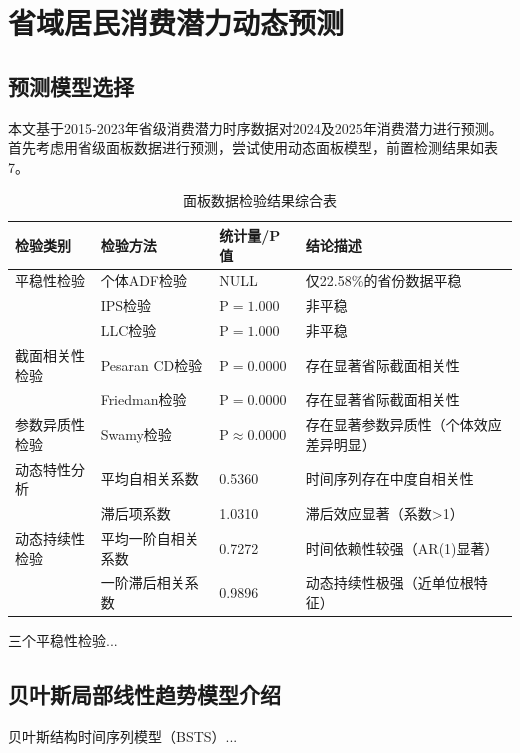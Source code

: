 \documentclass[UTF8,a4paper,zihao=-4,AutoFakeBold]{ctexart}
\begin{document}
	\section{省域居民消费潜力动态预测}
	\subsection{预测模型选择}
	本文基于2015-2023年省级消费潜力时序数据对2024及2025年消费潜力进行预测。首先考虑用省级面板数据进行预测，尝试使用动态面板模型，前置检测结果如表7。
	\begin{table}[H]
		\centering
		\caption{面板数据检验结果综合表}
		\renewcommand\arraystretch{1}
		\begin{tabular}{C{3cm}C{3cm}C{3cm}C{4cm}}
			\toprule[1.5pt] %
			 检验类别   &   检验方法    &  统计量/P值  & 结论描述  \\
			\midrule
			平稳性检验    &个体ADF检验 &  NULL  & 仅22.58\%的省份数据平稳 \\
			             &IPS检验 &  $\mathrm{P=1.000}$  & 非平稳 \\
		 	             &LLC检验 &  $\mathrm{P=1.000}$  & 非平稳 \\
		 	 \midrule
		 	 截面相关性检验  &Pesaran CD检验 &  $\mathrm{P=0.0000}$  & 存在显著省际截面相关性 \\
		 	 &Friedman检验 &  $\mathrm{P=0.0000}$  & 存在显著省际截面相关性 \\
		 	 \midrule
		 	 参数异质性检验  &Swamy检验 &  $\mathrm{P≈0.0000}$  & 存在显著参数异质性（个体效应差异明显） \\
		 	 \midrule
		 	 动态特性分析  &平均自相关系数 &  0.5360  & 时间序列存在中度自相关性 \\     
		 	 &滞后项系数 &  1.0310  & 滞后效应显著（系数>1） \\ 
		 	 \midrule
		 	 动态持续性检验  &平均一阶自相关系数 &  0.7272  & 时间依赖性较强（AR(1)显著） \\     
		 	 &一阶滞后相关系数 &  0.9896  & 动态持续性极强（近单位根特征） \\      
			\bottomrule[1.5pt] %
		\end{tabular}
	\end{table}
	
	三个平稳性检验...
	
	\subsection{贝叶斯局部线性趋势模型介绍}
	贝叶斯结构时间序列模型（BSTS）...
	
\end{document}
